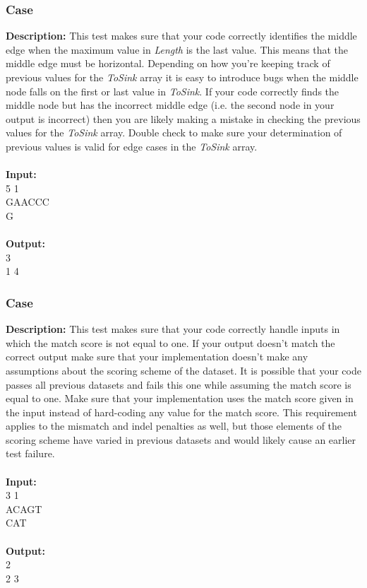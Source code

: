 \documentclass{article}
\newcommand{\code}[1]{{\fontfamily{pcr}\selectfont #1}}
\begin{document}
\subsubsection*{Case }
\hline \vspace{5}
\textbf{Description:} This test makes sure that your code correctly identifies the middle edge when the maximum value in \emph{Length} is the last value. This means that the middle edge must be horizontal. Depending on how you’re keeping track of previous values for the \emph{ToSink} array it is easy to introduce bugs when the middle node falls on the first or last value in \emph{ToSink}. If your code correctly finds the middle node but has the incorrect middle edge (i.e. the second node in your output is incorrect) then you are likely making a mistake in checking the previous values for the \emph{ToSink} array. Double check to make sure your determination of previous values is valid for edge cases in the \emph{ToSink} array.\\ \\
\noindent \textbf{Input:}\\
\code{1 5 1\\GAACCC\\G}\\ \\
\noindent \textbf{Output:}\\
\code{1 3\\1 4}

\subsubsection*{Case }
\hline \vspace{5}
\textbf{Description:} This test makes sure that your code correctly handle inputs in which the match score is not equal to one. If your output doesn’t match the correct output make sure that your implementation doesn’t make any assumptions about the scoring scheme of the dataset. It is possible that your code passes all previous datasets and fails this one while assuming the match score is equal to one. Make sure that your implementation uses the match score given in the input instead of hard-coding any value for the match score. This requirement applies to the mismatch and indel penalties as well, but those elements of the scoring scheme have varied in previous datasets and would likely cause an earlier test failure. \\ \\
\noindent \textbf{Input:}\\
\code{2 3 1\\ACAGT\\CAT}\\ \\
\noindent \textbf{Output:}\\
\code{1 2\\2 3}
\pagebreak
\end{document}
